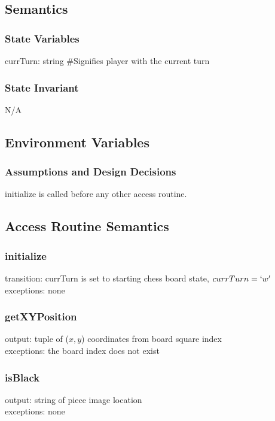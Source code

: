 \documentclass{article}
\begin{document}
    \subsection*{Semantics}
        \subsubsection*{State Variables}
            currTurn: string \#Signifies player with the current turn
            
        \subsubsection*{State Invariant}
            N/A
            
    \subsection*{Environment Variables}
            
        \subsubsection*{Assumptions and Design Decisions}
            initialize is called before any other access routine.
            
    \subsection*{Access Routine Semantics}
    
        \subsubsection*{initialize}
            transition: currTurn is set to starting chess board state, $currTurn = `w'$ \\ 
            exceptions: none
    
        \subsubsection*{getXYPosition}
            output: tuple of ($x, y$) coordinates from board square index \\ 
            exceptions: the board index does not exist
            
        \subsubsection*{isBlack}
            output: string of piece image location \\ 
            exceptions: none
        
\end{document}
